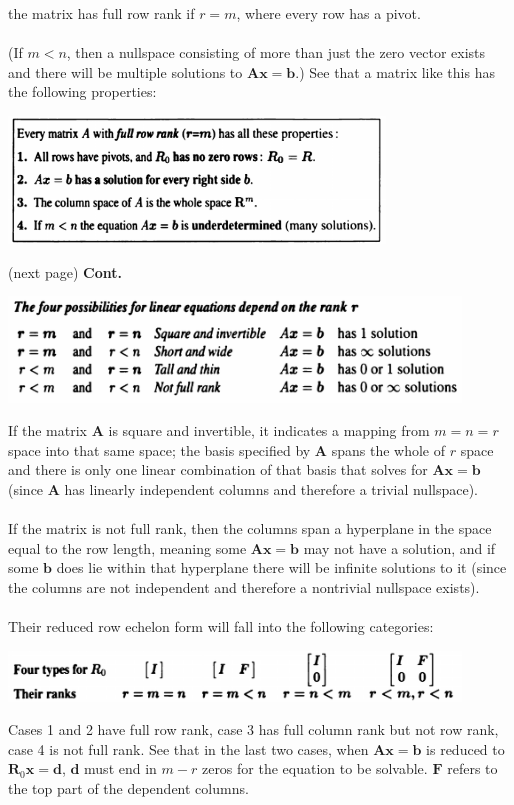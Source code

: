 \documentclass{report}
\begin{document}
the matrix has full row rank if $r=m$, where every row has a pivot.\\
\vspace{1mm}\\
(If $m<n$, then a nullspace consisting of more than just the zero vector exists and there will be multiple solutions to $\bm{Ax}=\bm b$.) See that a matrix like
this has the following properties:
\begin{center}
\includegraphics[width=10cm]{42}\\
\end{center}
(next page)\newpage
\noindent\textbf{Cont.}
\begin{center}
\includegraphics[width=12cm]{43}
\end{center}
If the matrix $\bm A$ is square and invertible, it indicates a mapping from $m=n=r$ space into that same space; the basis specified by $\bm A$ spans the whole of 
$r$ space
and there is only one linear combination of that basis that solves for $\bm{Ax}=\bm b$ (since $\bm A$ has linearly independent columns and therefore a trivial nullspace).\\
\vspace{1mm}\\
If the matrix is not full rank, then the columns span a hyperplane in the space equal to the row length, meaning some $\bm{Ax}=\bm b$ may not have a solution, and if
some $\bm b$ does lie within that hyperplane there will be infinite solutions to it (since the columns are not independent and therefore a nontrivial nullspace exists).\\
\vspace{1mm}\\
Their reduced row echelon form will fall into the following categories:
\begin{center}
\includegraphics[width=12cm]{44}
\end{center}
Cases 1 and 2 have full row rank, case 3 has full column rank but not row rank, case 4 is not full rank.
See that in the last two cases, when $\bm{Ax}=\bm b$ is reduced to $\bm R_0\bm x=\bm d$, $\bm d$ must end in $m-r$ zeros for the equation to be solvable. $\bm F$ refers
to the top part of the dependent columns.
\newpage
\end{document}

